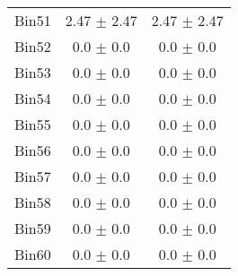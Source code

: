 \begin{tabular}{|c|c|c|}
     Bin51 & 2.47 $\pm$ 2.47 & 2.47 $\pm$ 2.47 \\ \cline{1-3} 
     Bin52 & 0.0 $\pm$ 0.0 & 0.0 $\pm$ 0.0 \\ \cline{1-3} 
     Bin53 & 0.0 $\pm$ 0.0 & 0.0 $\pm$ 0.0 \\ \cline{1-3} 
     Bin54 & 0.0 $\pm$ 0.0 & 0.0 $\pm$ 0.0 \\ \cline{1-3} 
     Bin55 & 0.0 $\pm$ 0.0 & 0.0 $\pm$ 0.0 \\ \cline{1-3} 
     Bin56 & 0.0 $\pm$ 0.0 & 0.0 $\pm$ 0.0 \\ \cline{1-3} 
     Bin57 & 0.0 $\pm$ 0.0 & 0.0 $\pm$ 0.0 \\ \cline{1-3} 
     Bin58 & 0.0 $\pm$ 0.0 & 0.0 $\pm$ 0.0 \\ \cline{1-3} 
     Bin59 & 0.0 $\pm$ 0.0 & 0.0 $\pm$ 0.0 \\ \cline{1-3} 
     Bin60 & 0.0 $\pm$ 0.0 & 0.0 $\pm$ 0.0 \\ \cline{1-3} 
  \end{tabular}
